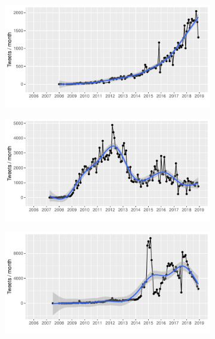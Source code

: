 \documentclass[
  a4paper,
  abstract=on,
  captions=tableabove
  ]{scrartcl}
\begin{document}
      \begin{figure}
        \centering
        \begin{subfigure}{.3\linewidth}
          \caption{}
          \includegraphics[width=\linewidth, height=.8\textheight, keepaspectratio]{"img/ui_upskill_gam.pdf"}
        \end{subfigure}
        \begin{subfigure}{.3\linewidth}
          \caption{}
          \includegraphics[width=\linewidth, height=.8\textheight, keepaspectratio]{"img/ui_hyperlocal_gam.pdf"}
        \end{subfigure}
        \begin{subfigure}{.3\linewidth}
          \caption{}
          \includegraphics[width=\linewidth, height=.8\textheight, keepaspectratio]{"img/ui_solopreneur_gam.pdf"}
        \end{subfigure}


\end{figure}
\end{document}
